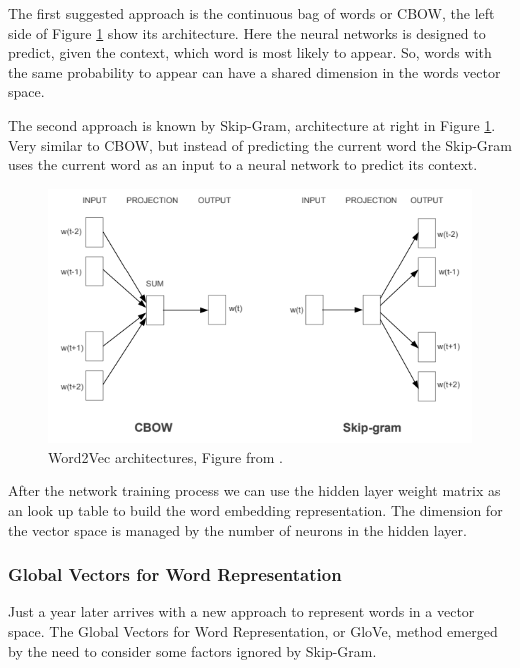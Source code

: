 	The first suggested approach is the continuous bag of words or CBOW, the left side of Figure \ref{fig:word2vecarchitectures} show its architecture. Here the neural networks is designed to predict, given the context, which word is most likely to appear. So, words with the same probability to appear can have a shared dimension in the words vector space. 

	The second approach is known by Skip-Gram, architecture at right in Figure \ref{fig:word2vecarchitectures}. Very similar to CBOW, but instead of predicting the current word the Skip-Gram uses the current word as an input to a neural network to predict its context.
	
	\begin{figure}[h!]
		\centering
		\includegraphics[width=0.85\linewidth]{01.Chapters/02.Background/word2vec_architectures}
		\caption{Word2Vec architectures, Figure from  \cite{mikolov2013efficient}.}
		\label{fig:word2vecarchitectures}
	\end{figure}
	
	
	After the network training process we can use the hidden layer weight matrix as an look up table to build the word embedding representation. The dimension for the vector space is managed by the number of neurons in the hidden layer. 		
	
	
	\subsubsection{Global Vectors for Word Representation} %
	
	Just a year later  arrives with a new approach to represent words in a vector space. The Global Vectors for Word Representation, or GloVe, method emerged by the need to consider some factors ignored by Skip-Gram.
		
